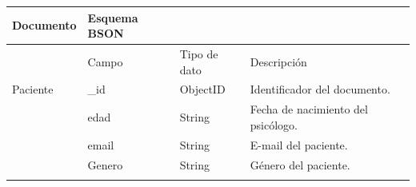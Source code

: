 \begin{table}[htpb]
\centering
\begin{tabularx}{\textwidth}{|l|X|X|X|X|}
\hline
Documento         & Esquema BSON                                                                       &                                                                          &                                                                                                                                                                                  \\ \hline
                  & Campo                                                                              & Tipo de dato                                                             & Descripción                                                                                                                                                                      \\ \hline
Paciente          & \_id                                                                               & ObjectID                                                                 & Identificador del documento.                                                                                                                                                     \\ \hline
\multirow{8}{*}{} & edad                                                                               & String                                                                   & Fecha de nacimiento del psicólogo.                                                                                                                                               \\ \cline{2-4} 
                  & email                                                                              & String                                                                   & E-mail del paciente.                                                                                                                                                             \\ \cline{2-4} 
                  & Genero                                                                             & String                                                                   & Género del paciente.                                                                                                                                                             \\ \cline{2-4} 

\end{tabularx}
\end{table}
